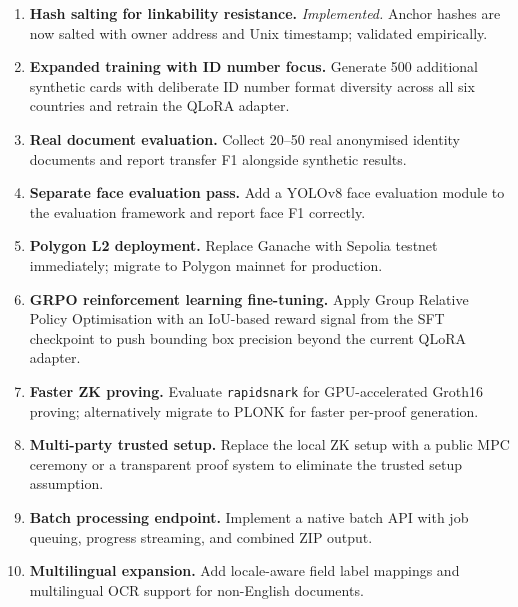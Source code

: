 \begin{enumerate}
 
  \item \textbf{Hash salting for linkability resistance.}
  \emph{Implemented.} Anchor hashes are now salted with
  owner address and Unix timestamp; validated empirically.
 
  \item \textbf{Expanded training with ID number focus.}
  Generate 500 additional synthetic cards with
  deliberate ID number format diversity across all
  six countries and retrain the QLoRA adapter.
 
  \item \textbf{Real document evaluation.}
  Collect 20--50 real anonymised identity documents
  and report transfer F1 alongside synthetic results.
 
  \item \textbf{Separate face evaluation pass.}
  Add a YOLOv8 face evaluation module to the
  evaluation framework and report face F1 correctly.
 
  \item \textbf{Polygon L2 deployment.}
  Replace Ganache with Sepolia testnet immediately;
  migrate to Polygon mainnet for production.
 
  \item \textbf{GRPO reinforcement learning fine-tuning.}
  Apply Group Relative Policy Optimisation with an
  IoU-based reward signal from the SFT checkpoint
  to push bounding box precision beyond the current
  QLoRA adapter.
 
  \item \textbf{Faster ZK proving.}
  Evaluate \texttt{rapidsnark} for GPU-accelerated
  Groth16 proving; alternatively migrate to PLONK
  for faster per-proof generation.
 
  \item \textbf{Multi-party trusted setup.}
  Replace the local ZK setup with a public MPC
  ceremony or a transparent proof system to eliminate
  the trusted setup assumption.
 
  \item \textbf{Batch processing endpoint.}
  Implement a native batch API with job queuing,
  progress streaming, and combined ZIP output.
 
  \item \textbf{Multilingual expansion.}
  Add locale-aware field label mappings and
  multilingual OCR support for non-English documents.
 
\end{enumerate}
 
